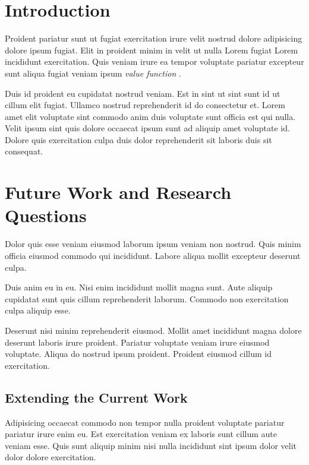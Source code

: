 \documentclass[a4paper, notitlepage, 11pt]{article}
\begin{document}


\setcounter{tocdepth}{1}
\tableofcontents

\section{Introduction}
Proident pariatur sunt ut fugiat exercitation irure velit nostrud dolore adipisicing dolore ipsum fugiat. Elit in proident minim in velit ut nulla Lorem fugiat Lorem incididunt exercitation. Quis veniam irure ea tempor voluptate pariatur excepteur sunt aliqua fugiat veniam ipsum \emph{value function}  \citep{Sutton2018}.  

Duis id proident eu cupidatat nostrud veniam. Est in sint ut sint sunt id ut cillum elit fugiat. Ullamco nostrud reprehenderit id do consectetur et. Lorem amet elit voluptate sint commodo anim duis voluptate sunt officia est qui nulla. Velit ipsum sint quis dolore occaecat ipsum sunt ad aliquip amet voluptate id. Dolore quis exercitation culpa duis dolor reprehenderit sit laboris duis sit consequat.





\section{Future Work and Research Questions}
Dolor quis esse veniam eiusmod laborum ipsum veniam non nostrud. Quis minim officia eiusmod commodo qui incididunt. Labore aliqua mollit excepteur deserunt culpa.

Duis anim eu in eu. Nisi enim incididunt mollit magna sunt. Aute aliquip cupidatat sunt quis cillum reprehenderit laborum. Commodo non exercitation culpa aliquip esse.

Deserunt nisi minim reprehenderit eiusmod. Mollit amet incididunt magna dolore deserunt laboris irure proident. Pariatur voluptate veniam irure eiusmod voluptate. Aliqua do nostrud ipsum proident. Proident eiusmod cillum id exercitation.

\subsection{Extending the Current Work}
Adipisicing occaecat commodo non tempor nulla proident voluptate pariatur pariatur irure enim eu. Est exercitation veniam ex laboris sunt cillum aute veniam esse. Quis sunt aliquip minim nisi nulla incididunt sint ipsum dolor velit dolor dolore exercitation.
\end{document}
